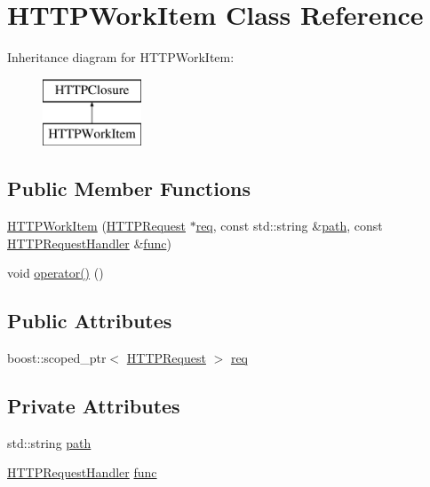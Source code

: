 \hypertarget{class_h_t_t_p_work_item}{}\section{H\+T\+T\+P\+Work\+Item Class Reference}
\label{class_h_t_t_p_work_item}
Inheritance diagram for H\+T\+T\+P\+Work\+Item\+:\begin{figure}[H]
\begin{center}
\leavevmode
\includegraphics[height=2.000000cm]{class_h_t_t_p_work_item}
\end{center}
\end{figure}
\subsection*{Public Member Functions}
\begin{DoxyCompactItemize}
\item 
\mbox{\hyperlink{class_h_t_t_p_work_item_adca1a11f0b3a58bd59a1671bd72fb3d0}{H\+T\+T\+P\+Work\+Item}} (\mbox{\hyperlink{class_h_t_t_p_request}{H\+T\+T\+P\+Request}} $\ast$\mbox{\hyperlink{class_h_t_t_p_work_item_adb8e8e5a46baf970c86761c8d52f8dc3}{req}}, const std\+::string \&\mbox{\hyperlink{class_h_t_t_p_work_item_aad6cb131efdc3207e8338d87bbb26d27}{path}}, const \mbox{\hyperlink{httpserver_8h_a90b0a9a188f591e83851dad2b701088f}{H\+T\+T\+P\+Request\+Handler}} \&\mbox{\hyperlink{class_h_t_t_p_work_item_afe949b2467b4eb8197423f350bf7adaf}{func}})
\item 
void \mbox{\hyperlink{class_h_t_t_p_work_item_a85addf7a6b8fdbf0a63becc7e1f0135e}{operator()}} ()
\end{DoxyCompactItemize}
\subsection*{Public Attributes}
\begin{DoxyCompactItemize}
\item 
boost\+::scoped\+\_\+ptr$<$ \mbox{\hyperlink{class_h_t_t_p_request}{H\+T\+T\+P\+Request}} $>$ \mbox{\hyperlink{class_h_t_t_p_work_item_adb8e8e5a46baf970c86761c8d52f8dc3}{req}}
\end{DoxyCompactItemize}
\subsection*{Private Attributes}
\begin{DoxyCompactItemize}
\item 
std\+::string \mbox{\hyperlink{class_h_t_t_p_work_item_aad6cb131efdc3207e8338d87bbb26d27}{path}}
\item 
\mbox{\hyperlink{httpserver_8h_a90b0a9a188f591e83851dad2b701088f}{H\+T\+T\+P\+Request\+Handler}} \mbox{\hyperlink{class_h_t_t_p_work_item_afe949b2467b4eb8197423f350bf7adaf}{func}}
\end{DoxyCompactItemize}


